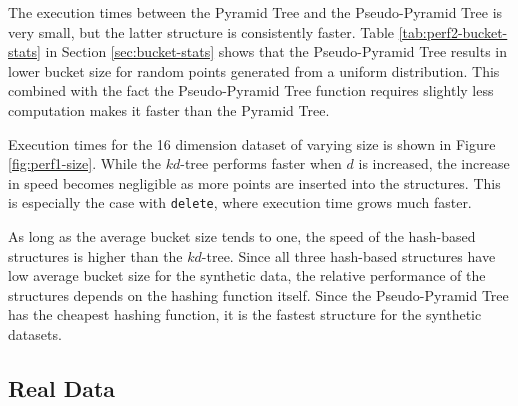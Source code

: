 The execution times between the Pyramid Tree and the Pseudo-Pyramid Tree is very small, but the latter structure is consistently faster. Table \ref{tab:perf2-bucket-stats} in Section \ref{sec:bucket-stats} shows that the Pseudo-Pyramid Tree results in lower bucket size for random points generated from a uniform distribution. This combined with the fact the Pseudo-Pyramid Tree function requires slightly less computation makes it faster than the Pyramid Tree.

Execution times for the 16 dimension dataset of varying size is shown in Figure \ref{fig:perf1-size}. While the $kd$-tree performs faster when $d$ is increased, the increase in speed becomes negligible as more points are inserted into the structures. This is especially the case with \texttt{delete}, where execution time grows much faster.

As long as the average bucket size tends to one, the speed of the hash-based structures is higher than the $kd$-tree. Since all three hash-based structures have low average bucket size for the synthetic data, the relative performance of the structures depends on the hashing function itself. Since the Pseudo-Pyramid Tree has the cheapest hashing function, it is the fastest structure for the synthetic datasets.

\subsection{Real Data}

